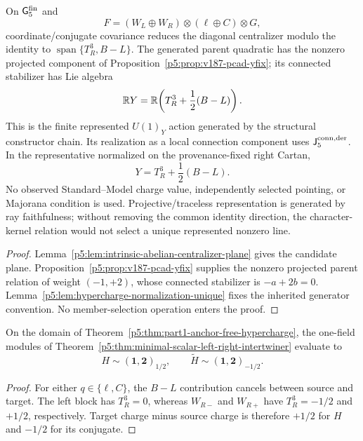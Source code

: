 \documentclass[11pt,a4paper]{article}
\begin{document}
\begin{theorem}
\label{p5:thm:conditional-hypercharge-reconstruction}
\label{p5:thm:part1-anchor-free-hypercharge}
On \(\mathsf G_5^{\rm fin}\) and
\[
F=(W_L\oplus W_R)\otimes(\ell\oplus C)\otimes G,
\]
coordinate/conjugate covariance reduces the diagonal centralizer modulo the
identity to \(\operatorname{span}\{T_R^3,B-L\}\).  The generated parent
quadratic has the nonzero projected component of
Proposition~\ref{p5:prop:v187-pcad-yfix}; its connected stabilizer has Lie
algebra
\[
\mathbb{R} Y
=
\mathbb{R}\!\left(T_R^3+\frac12(B-L)\right).
\]
This is the finite represented \(U(1)_Y\) action generated by the structural
constructor chain.  Its realization as a local connection component uses
\(\mathsf J_5^{\rm conn,der}\).  In the representative normalized on the
provenance-fixed right Cartan,
\begin{equation}
\label{p5:eq:part1-Y}
Y=T_R^3+\frac12(B-L).
\end{equation}
No observed Standard--Model charge value, independently selected pointing, or
Majorana condition is used.  Projective/traceless representation is generated
by ray faithfulness; without removing the common identity direction, the
character-kernel relation would not select a unique represented nonzero line.
\end{theorem}

\begin{proof}
Lemma~\ref{p5:lem:intrinsic-abelian-centralizer-plane} gives the candidate
plane.  Proposition~\ref{p5:prop:v187-pcad-yfix} supplies the nonzero projected
parent relation of weight \((-1,+2)\), whose connected stabilizer is
\(-a+2b=0\).  Lemma~\ref{p5:lem:hypercharge-normalization-unique} fixes the
inherited generator convention.  No member-selection operation enters the
proof.
\end{proof}

\begin{corollary}
\label{p5:cor:scalar-hypercharge-after-reconstruction}
On the domain of
Theorem~\ref{p5:thm:part1-anchor-free-hypercharge}, the one-field modules of
Theorem~\ref{p5:thm:minimal-scalar-left-right-intertwiner} evaluate to
\[
H\sim(\mathbf1,\mathbf2)_{1/2},
\qquad
\widetilde H\sim(\mathbf1,\mathbf2)_{-1/2}.
\]
\end{corollary}

\begin{proof}
For either \(q\in\{\ell,C\}\), the \(B-L\) contribution cancels between
source and target.  The left block has \(T_R^3=0\), whereas \(W_{R-}\) and
\(W_{R+}\) have \(T_R^3=-1/2\) and \(+1/2\), respectively.  Target charge
minus source charge is therefore \(+1/2\) for \(H\) and \(-1/2\) for its
conjugate.
\end{proof}
\end{document}

